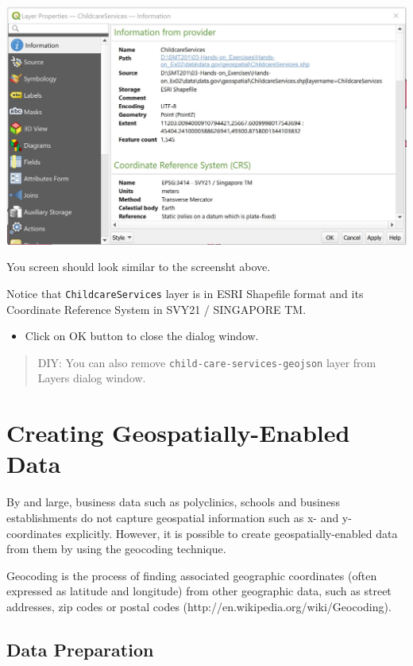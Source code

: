 \documentclass[
  letterpaper,
  DIV=11,
  numbers=noendperiod]{scrreprt}
\providecommand{\tightlist}{%
  \setlength{\itemsep}{0pt}\setlength{\parskip}{0pt}}\usepackage{longtable,booktabs,array}
\begin{document}
\includegraphics{./img02/image15.jpg}

You screen should look similar to the screensht above.

Notice that \texttt{ChildcareServices} layer is in ESRI Shapefile format
and its Coordinate Reference System in SVY21 / SINGAPORE TM.

\begin{itemize}
\tightlist
\item
  Click on OK button to close the dialog window.
\end{itemize}

\begin{quote}
DIY: You can also remove \texttt{child-care-services-geojson} layer from
Layers dialog window.
\end{quote}

\hypertarget{creating-geospatially-enabled-data}{%
\section{Creating Geospatially-Enabled
Data}\label{creating-geospatially-enabled-data}}

By and large, business data such as polyclinics, schools and business
establishments do not capture geospatial information such as x- and y-
coordinates explicitly. However, it is possible to create
geospatially-enabled data from them by using the geocoding technique.

Geocoding is the process of finding associated geographic coordinates
(often expressed as latitude and longitude) from other geographic data,
such as street addresses, zip codes or postal codes
(http://en.wikipedia.org/wiki/Geocoding).

\hypertarget{data-preparation}{%
\subsection{Data Preparation}\label{data-preparation}}
\end{document}
